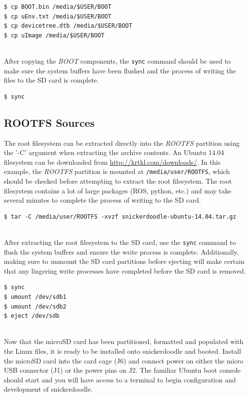 \begin{lstlisting}
$ cp BOOT.bin /media/$USER/BOOT
$ cp uEnv.txt /media/$USER/BOOT
$ cp devicetree.dtb /media/$USER/BOOT
$ cp uImage /media/$USER/BOOT
\end{lstlisting}

~\\
\noindent
After copying the \textit{BOOT} components, the \texttt{sync} command should be used to make sure the system buffers have been flushed and the process of writing the files to the SD card is complete. \\

\begin{lstlisting}
$ sync
\end{lstlisting}

\subsection{ROOTFS Sources}

The root filesystem can be extracted directly into the \textit{ROOTFS} partition using the '-C' argument when extracting the archive contents. An Ubuntu 14.04 filesystem can be downloaded from \url{http://krtkl.com/downloads/}. In this example, the \textit{ROOTFS} partition is mounted at \texttt{/media/user/ROOTFS}, which should be checked before attempting to extract the root filesystem. The root filesystem contains a lot of large packages (ROS, python, etc.) and may take several minutes to complete the process of writing to the SD card. \\

\begin{lstlisting}
$ tar -C /media/user/ROOTFS -xvzf snickerdoodle-ubuntu-14.04.tar.gz
\end{lstlisting}


~\\
\noindent
After extracting the root filesystem to the SD card, use the \texttt{sync} command to flush the system buffers and ensure the write process is complete. Additionally, making sure to unmount the SD card partitions before ejecting will make certain that any lingering write processes have completed before the SD card is removed. \\


\begin{lstlisting}
$ sync
$ umount /dev/sdb1
$ umount /dev/sdb2
$ eject /dev/sdb
\end{lstlisting}


~\\
\noindent
Now that the microSD card has been partitioned, formatted and populated with the Linux files, it is ready to be installed onto snickerdoodle and booted. Install the microSD card into the card cage (J6) and connect power on either the micro USB connector (J1) or the power pins on J2. The familiar Ubuntu boot console should start and you will have access to a terminal to begin configuration and development of snickerdoodle. 

